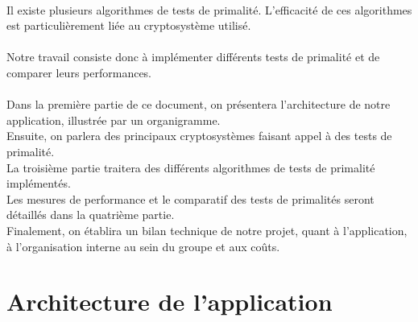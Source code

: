 	\paragraph{}Il existe plusieurs algorithmes de tests de primalité. L'efficacité de ces algorithmes est particulièrement liée au cryptosystème utilisé. 
	\paragraph{}Notre travail consiste donc à implémenter différents tests de primalité et de comparer leurs performances.
	\paragraph{}Dans la première partie de ce document, on présentera l'architecture de notre application, illustrée par un organigramme.\\
	Ensuite, on parlera des principaux cryptosystèmes faisant appel à des tests de primalité. \\
	La troisième partie traitera des différents algorithmes de tests de primalité implémentés.\\
	Les mesures de performance et le comparatif des tests de primalités seront détaillés dans la quatrième partie.\\
	Finalement, on établira un bilan technique de notre projet, quant à l'application, à l'organisation interne au sein du groupe et aux coûts.
	
	
	
	\section{Architecture de l'application}
	
